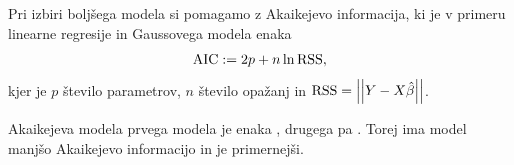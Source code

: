 \documentclass[12pt, a4paper]{article}
\begin{document}

Pri izbiri boljšega modela si pomagamo z Akaikejevo informacija, 
ki je v primeru linearne regresije in Gaussovega modela enaka
\[
    \operatorname{AIC} := 2p + n \ln \operatorname{RSS},
\]
kjer je $p$ število parametrov, $n$ število opažanj in $\operatorname{RSS} = \left\lvert\left\lvert Y - X\hat \beta\right\rvert\right\rvert$.

Akaikejeva modela prvega modela je enaka ,
drugega pa . Torej ima model 
manjšo Akaikejevo informacijo in je primernejši. 

% 
\end{document}
